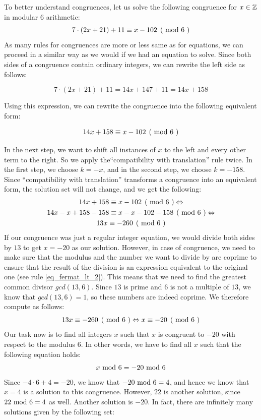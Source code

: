 \begin{example}
\label{example_first_congruence}
To better understand congruences, let us solve the following congruence for $x\in \mathbb{Z}$ in modular $6$ arithmetic:
$$\kongru{7\cdot(2x+21) + 11}{x-102}{6}$$
As many rules for congruences are more or less same as for equations, we can proceed in a  similar way as we would if we had an equation to solve. Since both sides of a congruence contain ordinary integers, we can rewrite the left side as follows: 

$$7\cdot(2x+21) + 11 = 14x + 147 + 11 = 14x +158$$

Using this expression, we can rewrite the congruence into the following equivalent form:

$$\kongru{14x +158}{x-102}{6}$$

In the next step, we want to shift all instances of $x$ to the left and every other term to the right. So we apply the``compatibility with translation'' rule twice. In the first step, we choose $k=-x$, and in the second step, we choose $k=-158$.  Since ``compatibility with translation'' transforms a congruence into an equivalent form, the solution set will not change, and we get the following:
\begin{multline*}
\kongru{14x +158}{x-102}{6} \Leftrightarrow\\
\kongru{14x-x +158-158}{x-x-102-158}{6} \Leftrightarrow \\
\kongru{13x}{-260}{6}
\end{multline*}
If our congruence was just a regular integer equation, we would divide both sides by $13$ to get $x=-20$ as our solution. However, in case of congruence, we need to make sure that the modulus and the number we want to divide by are coprime to ensure that the result of the division is an expression equivalent to the original one (see rule \ref{eq_fermat_lt_2}). This means that we need to find the greatest common divisor $gcd(13,6)$. Since $13$ is prime and $6$ is not a multiple of $13$, we know that $gcd(13,6)=1$, so these numbers are indeed coprime. We therefore compute as follows:
$$
\kongru{13x}{-260}{6} \Leftrightarrow \kongru{x}{-20}{6}
$$
Our task now is  to find all integers $x$ such that $x$ is congruent to $-20$ with respect to the modulus $6$. In other words, we have to find all $x$ such that the following equation holds:
$$
x \text{ mod } 6 = -20 \text{ mod } 6
$$
Since $-4\cdot 6 +4 = -20$, we know that $ -20 \text{ mod } 6 = 4$, and hence we know that $x=4$ is a solution to this congruence. However, $22$ is another solution, since $ 22 \text{ mod } 6 = 4$ as well. Another solution is $-20$. In fact, there are infinitely many solutions given by the following set:

\end{example}
